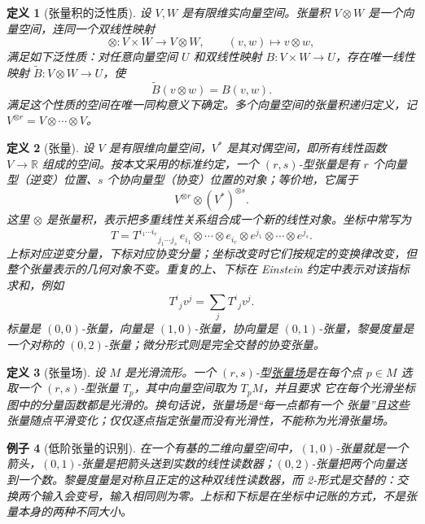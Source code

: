 \documentclass[UTF8,fontset=none,a4paper,11pt]{ctexart}
\theoremstyle{foundation-definition}
\newtheorem{definition}{定义}[section]
\theoremstyle{foundation-theorem}
\theoremstyle{foundation-proposition}
\theoremstyle{foundation-example}
\newtheorem{example}[definition]{例子}
\theoremstyle{foundation-remark}
\theoremstyle{foundation-theorem}
\newcommand{\term}[2]{\hyperref[#1]{#2}}
\begin{document}
\begin{definition}[张量积的泛性质]\label{def:tensor-product}
设 \(V,W\) 是有限维实向量空间。张量积 \(V\otimes W\) 是一个向量空间，连同一个双线性映射
\[
\otimes:V\times W\longrightarrow V\otimes W,\qquad(v,w)\longmapsto v\otimes w,
\]
满足如下泛性质：对任意向量空间 \(U\) 和双线性映射 \(B:V\times W\to U\)，存在唯一线性映射
\(\widetilde B:V\otimes W\to U\)，使
\[
\widetilde B(v\otimes w)=B(v,w).
\]
满足这个性质的空间在唯一同构意义下确定。多个向量空间的张量积递归定义，记
\(V^{\otimes r}=V\otimes\cdots\otimes V\)。
\end{definition}

\begin{definition}[张量]\label{def:tensor}
设 \(V\) 是有限维向量空间，\(V^*\) 是其对偶空间，即所有线性函数 \(V\to\mathbb R\) 组成的空间。按本文采用的标准约定，一个 \((r,s)\)-型张量是有 \(r\) 个向量型（逆变）位置、\(s\) 个协向量型（协变）位置的对象；等价地，它属于
\[
V^{\otimes r}\otimes (V^*)^{\otimes s}.
\]
这里 \(\otimes\) 是张量积，表示把多重线性关系组合成一个新的线性对象。坐标中常写为
\[
T=T^{i_1\cdots i_r}{}_{j_1\cdots j_s}
\,e_{i_1}\otimes\cdots\otimes e_{i_r}
\otimes e^{j_1}\otimes\cdots\otimes e^{j_s}.
\]
上标对应逆变分量，下标对应协变分量；坐标改变时它们按规定的变换律改变，但整个张量表示的几何对象不变。重复的上、下标在 Einstein 约定中表示对该指标求和，例如
\[
T^i{}_jv^j=\sum_jT^i{}_jv^j.
\]
标量是 \((0,0)\)-张量，向量是 \((1,0)\)-张量，协向量是 \((0,1)\)-张量，黎曼度量是一个对称的 \((0,2)\)-张量；微分形式则是完全交替的协变张量。
\end{definition}

\begin{definition}[张量场]\label{def:tensor-field}
设 \(M\) 是光滑流形。一个 \((r,s)\)-型\term{def:tensor-field}{张量场}是在每个点
\(p\in M\) 选取一个 \((r,s)\)-型张量 \(T_p\)，其中向量空间取为 \(T_pM\)，并且要求
它在每个光滑坐标图中的分量函数都是光滑的。换句话说，张量场是“每一点都有一个
张量”且这些张量随点平滑变化；仅仅逐点指定张量而没有光滑性，不能称为光滑张量场。
\end{definition}

\begin{example}[低阶张量的识别]
在一个有基的二维向量空间中，\((1,0)\)-张量就是一个箭头，\((0,1)\)-张量是把箭头送到实数的线性读数器；\((0,2)\)-张量把两个向量送到一个数。黎曼度量是对称且正定的这种双线性读数器，而 2-形式是交替的：交换两个输入会变号，输入相同则为零。上标和下标是在坐标中记账的方式，不是张量本身的两种不同大小。
\end{example}
\end{document}
